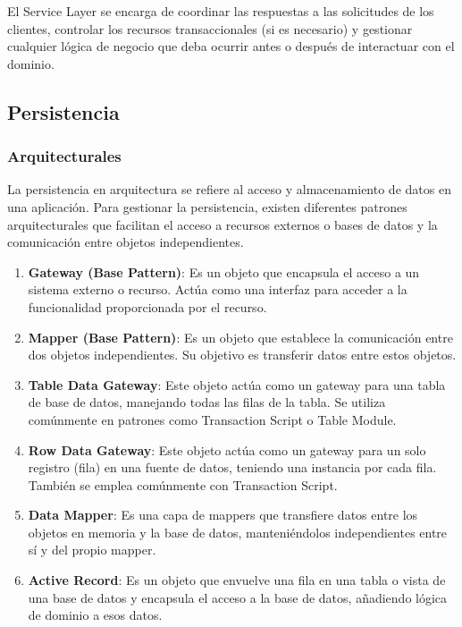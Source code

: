 \documentclass{article}
\begin{document}
		El Service Layer se encarga de coordinar las respuestas a las solicitudes de los clientes, controlar los recursos transaccionales (si es necesario) y gestionar cualquier lógica de negocio que deba ocurrir antes o después de interactuar con el dominio.
		
		\subsection{Persistencia}
		\subsubsection{Arquitecturales}
		La persistencia en arquitectura se refiere al acceso y almacenamiento de datos en una aplicación. Para gestionar la persistencia, existen diferentes patrones arquitecturales que facilitan el acceso a recursos externos o bases de datos y la comunicación entre objetos independientes.
		\begin{enumerate}
			\item {\textbf{Gateway (Base Pattern)}}: Es un objeto que encapsula el acceso a un sistema externo o recurso. Actúa como una interfaz para acceder a la funcionalidad proporcionada por el recurso.
			
			
			
			\item {\textbf{Mapper (Base Pattern)}}:  Es un objeto que establece la comunicación entre dos objetos independientes. Su objetivo es transferir datos entre estos objetos.
			
			\item {\textbf{Table Data Gateway}}: Este objeto actúa como un gateway para una tabla de base de datos, manejando todas las filas de la tabla. Se utiliza comúnmente en patrones como Transaction Script o Table Module.

            \item {\textbf{Row Data Gateway}}: Este objeto actúa como un gateway para un solo registro (fila) en una fuente de datos, teniendo una instancia por cada fila. También se emplea comúnmente con Transaction Script.
			
			\item {\textbf{Data Mapper}}: Es una capa de mappers que transfiere datos entre los objetos en memoria y la base de datos, manteniéndolos independientes entre sí y del propio mapper.
			
			
			
			\item {\textbf{Active Record}}: Es un objeto que envuelve una fila en una tabla o vista de una base de datos y encapsula el acceso a la base de datos, añadiendo lógica de dominio a esos datos.
		\end{enumerate}
		
\end{document}
